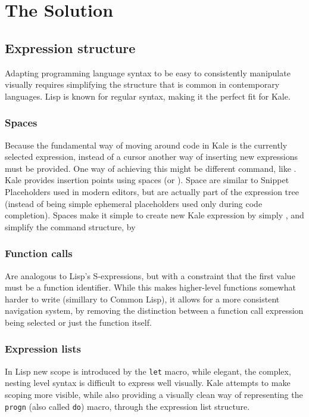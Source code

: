 \chapter{The Solution}

\section{Expression structure}

Adapting programming language syntax to be easy to consistently manipulate
visually requires simplifying the structure that is common in contemporary
languages. Lisp is known for regular syntax, making it the perfect fit for
Kale.


\subsection{Spaces}
Because the fundamental way of moving around code in Kale is the currently
selected expression, instead of a cursor another way of inserting new
expressions must be provided. One way of achieving this might be different
 command, like . Kale
provides insertion points using spaces (or ).
Space are similar to Snippet Placeholders used in modern editors,
but are actually part of the expression tree (instead of being simple ephemeral
placeholders used only during code completion). Spaces make it simple to create
new Kale expression by simply , and simplify the
command structure, by 

\subsection{Function calls}
Are analogous to Lisp's S-expressions, but with a constraint that the first
value must be a function identifier. While this makes higher-level functions
somewhat harder to write (simillary to Common Lisp), it allows for a more
consistent navigation system, by removing the distinction between a function
call expression being selected or just the function itself.

\subsection{Expression lists}
In Lisp new scope is introduced by the \texttt{let} macro, while elegant, the
complex, nesting level syntax is difficult to express well visually. Kale
attempts to make scoping more visible, while also providing a visually clean
way of representing the \texttt{progn} (also called \texttt{do}) macro,
through the expression list structure.

